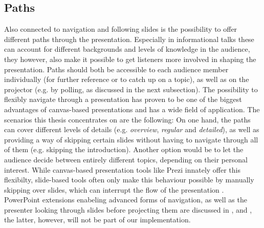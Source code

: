 \subsection{Paths}
Also connected to navigation and following slides is the possibility to offer different paths through the presentation. Especially in informational talks these can account for different backgrounds and levels of knowledge in the audience, they however, also make it possible to get listeners more involved in shaping the presentation. Paths should both be accessible to each audience member individually (for further reference or to catch up on a topic), as well as on the projector (e.g. by polling, as discussed in the next subsection).
The possibility to flexibly navigate through a presentation has proven to be one of the biggest advantages of canvas-based presentations \cite{Lichtschlag:CanvasPresentationsInTheWild} and has a wide field of application. The scenarios this thesis concentrates on are the following: On one hand, the paths can cover different levels of details (e.g. \emph{overview}, \emph{regular} and \emph{detailed}), as well as providing a way of skipping certain slides without having to navigate through all of them (e.g. skipping the introduction). Another option would be to let the audience decide between entirely different topics, depending on their personal interest. While canvas-based presentation tools like Prezi innately offer this flexibilty, slide-based tools often only make this behaviour possible by manually skipping over slides, which can interrupt the flow of the presentation \cite{Dieberger:NarrativeFlow}. PowerPoint extensions enabeling advanced forms of navigation, as well as the presenter looking through slides before projecting them are discussed in \cite{Dieberger:NarrativeFlow}, \cite{Nelson:PalettePaperInterface} and \cite{Signer:PaperPoint}, the latter, however, will not be part of our implementation.

